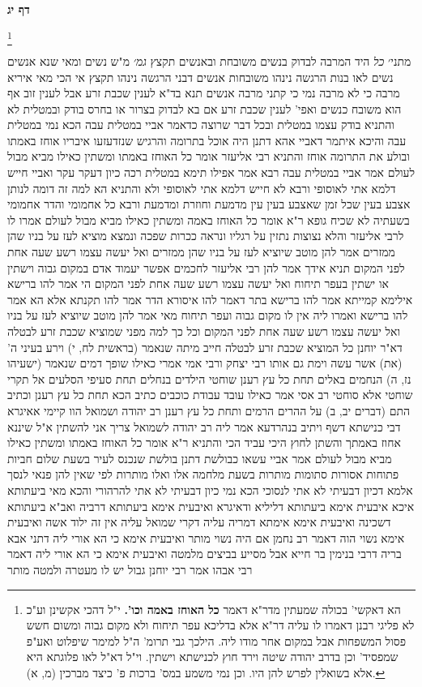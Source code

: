 \documentclass[12pt, openany]{book}
\newcommand{\sethebfont}{
\fontsize{10.5pt}{21.0pt} \selectfont
}
\newcommand{\twocol}[1]{
	{\sethebfont \begin{multicols}{2}
			#1
	\end{multicols}}	
}
\newcommand{\sectname}{}
\newcommand{\newsection}[1]{
	\addcontentsline{toc}{section}{#1}
	\renewcommand{\sectname}{#1}	
	\vspace{-\baselineskip}
	\begin{center}
		\textbf{%
\fontsize{16pt}{16pt}\selectfont
			#1}
	\end{center}
	\vspace{-\baselineskip}
	\nopagebreak
}
\newcommand{\footnotecomment}[1]{\footnote{#1}}
\newcommand{\commenta}[1]{\footnotecomment{#1}}
\begin{document}
\newsection{דף יג}
\twocol{
\commenta{הא דאקשי' בכולה שמעתין מדר"א דאמר \textbf{כל האוחז באמה וכו'.}  י"ל דהכי אקשינן וע"כ לא פליגי רבנן דאמרו לו עליה דר"א אלא בדליכא עפר תיחוח ולא מקום גבוה ומשום חשש פסול המשפחות אבל במקום אחר מודו ליה. הילכך גבי תרומ' ה"ל למימר שיפלוט ואע"פ שמפסיד' וכן בדרב יהודה שיטה וירד חוץ לכנישתא וישתין. וי"ל דא"ל לאו פלוגתא היא אלא בשואלין לפרש להן היו. וכן נמי משמע במס' ברכות פ' כיצד מברכין (מ, א). }

מתני׳ {\large\emph{כל}} היד המרבה לבדוק בנשים משובחת ובאנשים תקצץ
{\large\emph{גמ׳}} מ"ש נשים ומאי שנא אנשים נשים לאו בנות הרגשה נינהו משובחות אנשים דבני הרגשה נינהו תקצץ 
אי הכי מאי איריא מרבה  כי לא מרבה נמי  כי קתני מרבה אנשים 
תנא  בד"א לענין שכבת זרע אבל לענין זוב אף הוא משובח כנשים 
ואפי' לענין שכבת זרע אם בא לבדוק בצרור או בחרס בודק 
ובמטלית לא  והתניא  בודק עצמו במטלית ובכל דבר שרוצה  כדאמר אביי  במטלית עבה הכא נמי במטלית עבה 
והיכא איתמר דאביי  אהא דתנן  היה אוכל בתרומה והרגיש שנזדעזעו איבריו אוחז באמתו ובולע את התרומה 
אוחז  והתניא רבי אליעזר אומר  כל האוחז באמתו ומשתין כאילו מביא מבול לעולם  אמר אביי  במטלית עבה 
רבא אמר  אפילו תימא במטלית רכה כיון דעקר עקר  ואביי חייש דלמא אתי לאוסופי ורבא לא חייש דלמא אתי לאוסופי
 ולא  והתניא  הא למה זה דומה לנותן אצבע בעין שכל זמן שאצבע בעין עין מדמעת וחוזרת ומדמעת 
ורבא כל אחמומי והדר אחמומי בשעתיה לא שכיח 
גופא ר"א אומר  כל האוחז באמה ומשתין כאילו מביא מבול לעולם  אמרו לו לרבי אליעזר  והלא נצוצות נתזין על רגליו ונראה ככרות שפכה ונמצא מוציא לעז על בניו שהן ממזרים 
אמר להן  מוטב שיוציא לעז על בניו שהן ממזרים ואל יעשה עצמו רשע שעה אחת לפני המקום 
תניא אידך אמר להן רבי אליעזר לחכמים  אפשר יעמוד אדם במקום גבוה וישתין או ישתין בעפר תיחוח ואל יעשה עצמו רשע שעה אחת לפני המקום 
הי אמר להו ברישא  אילימא קמייתא אמר להו ברישא בתר דאמר להו איסורא הדר אמר להו תקנתא 
אלא הא אמר להו ברישא  ואמרו ליה  אין לו מקום גבוה ועפר תיחוח מאי  אמר להן  מוטב שיוציא לעז על בניו ואל יעשה עצמו רשע שעה אחת לפני המקום
וכל כך למה  מפני שמוציא שכבת זרע לבטלה  דא"ר יוחנן  כל המוציא שכבת זרע לבטלה חייב מיתה שנאמר  (בראשית לח, י) וירע בעיני ה' (את) אשר עשה וימת גם אותו 
רבי יצחק ורבי אמי אמרי  כאילו שופך דמים שנאמר  (ישעיהו נז, ה) הנחמים באלים תחת כל עץ רענן שוחטי הילדים בנחלים תחת סעיפי הסלעים אל תקרי שוחטי אלא סוחטי 
רב אסי אמר  כאילו עובד עבודת כוכבים כתיב הכא תחת כל עץ רענן וכתיב התם (דברים יב, ב) על ההרים הרמים ותחת כל עץ רענן 
רב יהודה ושמואל הוו קיימי אאיגרא דבי כנישתא דשף ויתיב בנהרדעא  אמר ליה רב יהודה לשמואל  צריך אני להשתין  א"ל  שיננא אחוז באמתך והשתן לחוץ 
היכי עביד הכי  והתניא ר"א אומר  כל האוחז באמתו ומשתין כאילו מביא מבול לעולם 
אמר אביי  עשאו כבולשת  דתנן  בולשת שנכנס לעיר בשעת שלום חביות פתוחות אסורות סתומות מותרות  בשעת מלחמה אלו ואלו מותרות לפי שאין להן פנאי לנסך  אלמא  דכיון דבעיתי לא אתי לנסוכי הכא נמי כיון דבעיתי לא אתי להרהורי 
והכא מאי ביעתותא איכא  איבעית אימא  ביעתותא דליליא ודאיגרא  ואיבעית אימא  ביעתותא דרביה  ואב"א  ביעתותא דשכינה  ואיבעית אימא  אימתא דמריה עליה דקרי שמואל עליה  אין זה ילוד אשה 
ואיבעית אימא  נשוי הוה דאמר רב נחמן  אם היה נשוי מותר 
ואיבעית אימא  כי הא אורי ליה דתני אבא בריה דרבי בנימין בר חייא  אבל מסייע בביצים מלמטה  ואיבעית אימא  כי הא אורי ליה דאמר רבי אבהו אמר רבי יוחנן  גבול יש לו מעטרה ולמטה מותר}
\end{document}
